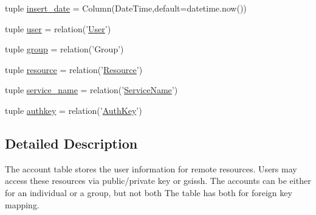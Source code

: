 \begin{DoxyCompactItemize}
\item 
tuple \hyperlink{classcyberweb_1_1model_1_1resource_1_1_account_a863b4a5a199ea9f30b32d5de8f7ecce0}{insert\-\_\-date} = \-Column(\-Date\-Time,default=datetime.\-now())
\item 
tuple \hyperlink{classcyberweb_1_1model_1_1resource_1_1_account_acb970ebcb2f2edd67d7edbb06efa77c5}{user} = relation('\hyperlink{classcyberweb_1_1model_1_1user_1_1_user}{\-User}')
\item 
tuple \hyperlink{classcyberweb_1_1model_1_1resource_1_1_account_ab3ca66247e0198d822fbd05a8dd75cc9}{group} = relation('\-Group')
\item 
tuple \hyperlink{classcyberweb_1_1model_1_1resource_1_1_account_ad95612c92c4bc23ceab9c38526172082}{resource} = relation('\hyperlink{classcyberweb_1_1model_1_1resource_1_1_resource}{\-Resource}')
\item 
tuple \hyperlink{classcyberweb_1_1model_1_1resource_1_1_account_acd72894d60a98e95b8b0aea7d66fb8dd}{service\-\_\-name} = relation('\hyperlink{classcyberweb_1_1model_1_1service_1_1_service_name}{\-Service\-Name}')
\item 
tuple \hyperlink{classcyberweb_1_1model_1_1resource_1_1_account_aade0db1ce4672b3c0ee0330c2ce9cd03}{authkey} = relation('\hyperlink{classcyberweb_1_1model_1_1resource_1_1_auth_key}{\-Auth\-Key}')
\end{DoxyCompactItemize}


\subsection{\-Detailed \-Description}
\begin{DoxyVerb}
    The account table stores the user information for remote resources. Users may access these
    resources via public/private key or gsissh. The accounts can be either for an individual or a group, but not both
    The table has both for foreign key mapping.
    \end{DoxyVerb}
 

